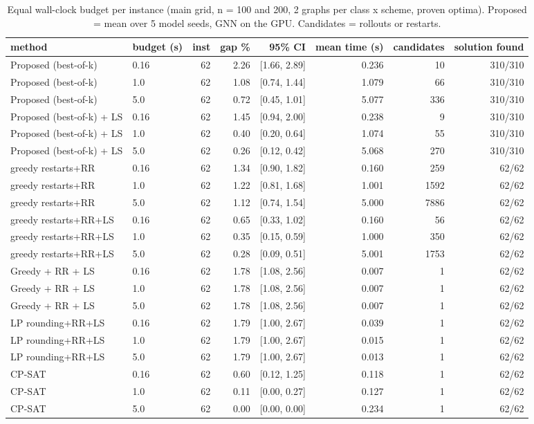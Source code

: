 \begin{table}[t]
\centering
\caption{Equal wall-clock budget per instance (main grid, n = 100 and 200, 2 graphs per class x scheme, proven optima). Proposed = mean over 5 model seeds, GNN on the GPU. Candidates = rollouts or restarts.}
\label{tab:equal_time}
\scriptsize
\begin{tabular}{llrrrrrr}
\toprule
method & budget (s) & inst & gap \% & 95\% CI & mean time (s) & candidates & solution found \\
\midrule
Proposed (best-of-k) & 0.16 & 62 & 2.26 & [1.66, 2.89] & 0.236 & 10 & 310/310 \\
Proposed (best-of-k) & 1.0 & 62 & 1.08 & [0.74, 1.44] & 1.079 & 66 & 310/310 \\
Proposed (best-of-k) & 5.0 & 62 & 0.72 & [0.45, 1.01] & 5.077 & 336 & 310/310 \\
Proposed (best-of-k) + LS & 0.16 & 62 & 1.45 & [0.94, 2.00] & 0.238 & 9 & 310/310 \\
Proposed (best-of-k) + LS & 1.0 & 62 & 0.40 & [0.20, 0.64] & 1.074 & 55 & 310/310 \\
Proposed (best-of-k) + LS & 5.0 & 62 & 0.26 & [0.12, 0.42] & 5.068 & 270 & 310/310 \\
greedy restarts+RR & 0.16 & 62 & 1.34 & [0.90, 1.82] & 0.160 & 259 & 62/62 \\
greedy restarts+RR & 1.0 & 62 & 1.22 & [0.81, 1.68] & 1.001 & 1592 & 62/62 \\
greedy restarts+RR & 5.0 & 62 & 1.12 & [0.74, 1.54] & 5.000 & 7886 & 62/62 \\
greedy restarts+RR+LS & 0.16 & 62 & 0.65 & [0.33, 1.02] & 0.160 & 56 & 62/62 \\
greedy restarts+RR+LS & 1.0 & 62 & 0.35 & [0.15, 0.59] & 1.000 & 350 & 62/62 \\
greedy restarts+RR+LS & 5.0 & 62 & 0.28 & [0.09, 0.51] & 5.001 & 1753 & 62/62 \\
Greedy + RR + LS & 0.16 & 62 & 1.78 & [1.08, 2.56] & 0.007 & 1 & 62/62 \\
Greedy + RR + LS & 1.0 & 62 & 1.78 & [1.08, 2.56] & 0.007 & 1 & 62/62 \\
Greedy + RR + LS & 5.0 & 62 & 1.78 & [1.08, 2.56] & 0.007 & 1 & 62/62 \\
LP rounding+RR+LS & 0.16 & 62 & 1.79 & [1.00, 2.67] & 0.039 & 1 & 62/62 \\
LP rounding+RR+LS & 1.0 & 62 & 1.79 & [1.00, 2.67] & 0.015 & 1 & 62/62 \\
LP rounding+RR+LS & 5.0 & 62 & 1.79 & [1.00, 2.67] & 0.013 & 1 & 62/62 \\
CP-SAT & 0.16 & 62 & 0.60 & [0.12, 1.25] & 0.118 & 1 & 62/62 \\
CP-SAT & 1.0 & 62 & 0.11 & [0.00, 0.27] & 0.127 & 1 & 62/62 \\
CP-SAT & 5.0 & 62 & 0.00 & [0.00, 0.00] & 0.234 & 1 & 62/62 \\
\bottomrule
\end{tabular}
\end{table}
